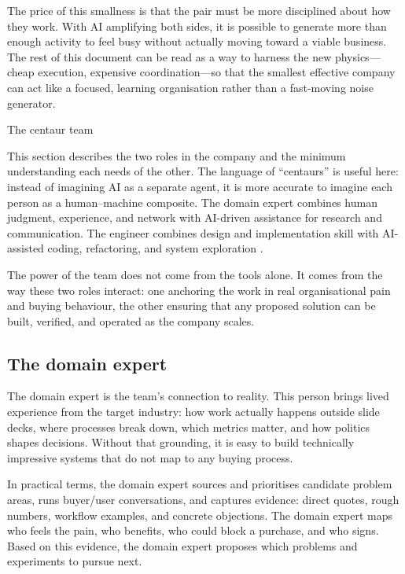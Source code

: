 \documentclass[10pt, a4paper, twocolumn]{article} %
\makeatletter
\let\orig@section\section %
\renewcommand{\section}{%
  \@ifstar{\orig@section*}{\unnumberedsteppingsection}%
}
\newcommand{\unnumberedsteppingsection}[1]{%
  \refstepcounter{section}%
  \orig@section*{#1}%
}
\makeatother
\begin{document}
The price of this smallness is that the pair must be more disciplined about how they work. With AI amplifying both sides, it is possible to generate more than enough activity to feel busy without actually moving toward a viable business. The rest of this document can be read as a way to harness the new physics—cheap execution, expensive coordination—so that the smallest effective company can act like a focused, learning organisation rather than a fast-moving noise generator.






\section{The centaur team}

This section describes the two roles in the company and the minimum understanding each needs of the other. The language of ``centaurs'' is useful here: instead of imagining AI as a separate agent, it is more accurate to imagine each person as a human--machine composite. The domain expert combines human judgment, experience, and network with AI-driven assistance for research and communication. The engineer combines design and implementation skill with AI-assisted coding, refactoring, and system exploration \citep{blomgren2025coordination}.

The power of the team does not come from the tools alone. It comes from the way these two roles interact: one anchoring the work in real organisational pain and buying behaviour, the other ensuring that any proposed solution can be built, verified, and operated as the company scales.

\newpage

\subsection{The domain expert}

The domain expert is the team's connection to reality. This person brings lived experience from the target industry: how work actually happens outside slide decks, where processes break down, which metrics matter, and how politics shapes decisions. Without that grounding, it is easy to build technically impressive systems that do not map to any buying process.

In practical terms, the domain expert sources and prioritises candidate problem areas, runs buyer/user conversations, and captures evidence: direct quotes, rough numbers, workflow examples, and concrete objections. The domain expert maps who feels the pain, who benefits, who could block a purchase, and who signs. Based on this evidence, the domain expert proposes which problems and experiments to pursue next.
\end{document}
